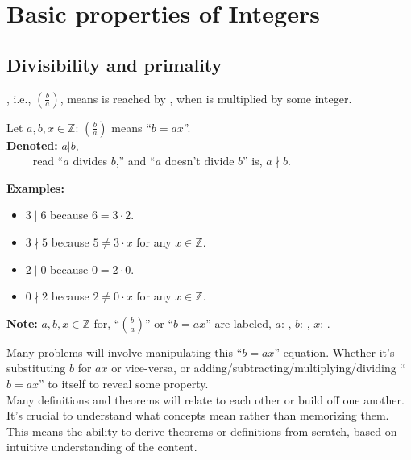 \chapter{Basic properties of Integers}

\section{Divisibility and primality}

, i.e., $\left(\frac{b}{a}\right)$, means  is reached by , when  is multiplied by some integer.

\begin{Def}[Division]

    Let $a,b,x\in\mathbb{Z}$: $\left(\frac{b}{a}\right)$ means ``$b=ax$''.\\

    \noindent
    \underline{\textbf{Denoted:} $a|b$,}\\
    $\qquad$ read ``$a$ divides $b$,'' and ``$a$ doesn't divide $b$'' is, $a\nmid b$.\\
    \noindent
\end{Def}

\noindent
\textbf{Examples:}
\begin{itemize}
    \item $3\mid 6$ because $6=3\cdot2$.
    \item $3\nmid5$ because $5\neq3\cdot x$ for any $x\in\mathbb{Z}$.
    \item $2\mid 0$ because $0=2\cdot0$.
    \item $0\nmid2$ because $2\neq0\cdot x$ for any $x\in\mathbb{Z}$.
\end{itemize}


\begin{Note}
    \textbf{Note:} $a,b,x\in\mathbb{Z}$ for, ``$\left(\frac{b}{a}\right)$'' or ``$b = ax$'' are labeled, $a$: , $b$: , $x$: .
\end{Note}

\begin{Tip}
    Many problems will involve manipulating this ``$b=ax$'' equation. Whether
    it's substituting $b$ for $ax$ or vice-versa, or adding/subtracting/multiplying/dividing ``$b=ax$''
    to itself to reveal some property.\\

    \noindent
    Many definitions and theorems will relate to each other or build off one another.
    It's crucial to understand what concepts mean rather than memorizing them. This means
    the ability to derive theorems or definitions from scratch, based on intuitive
    understanding of the content.
\end{Tip}

